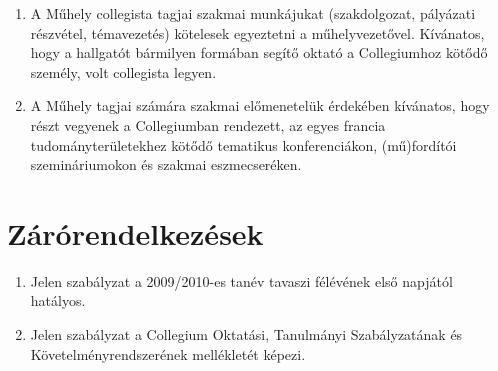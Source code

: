 \documentclass{../styles/rulebook}
\begin{document}
\begin{enumerate}
\begin{enumerate}
	\end{enumerate}
	\item A Műhely collegista tagjai szakmai munkájukat (szakdolgozat, pályázati részvétel, témavezetés) kötelesek egyeztetni a műhelyvezetővel. Kívánatos, hogy a hallgatót bármilyen formában segítő oktató a Collegiumhoz kötődő személy, volt collegista legyen.
	\item A Műhely tagjai számára szakmai előmenetelük érdekében kívánatos, hogy részt vegyenek a Collegiumban rendezett, az egyes francia tudományterületekhez kötődő tematikus konferenciákon, (mű)fordítói szemináriumokon és szakmai eszmecseréken.
\end{enumerate}


\section{Zárórendelkezések}

\begin{enumerate}
	\item Jelen szabályzat a 2009/2010-es tanév tavaszi félévének első napjától hatályos.
	\item Jelen szabályzat a Collegium Oktatási, Tanulmányi Szabályzatának és Követelményrendszerének mellékletét képezi.
\end{enumerate}
\end{document}
